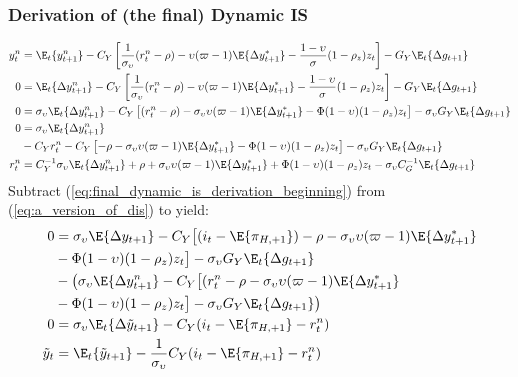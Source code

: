 \subsubsection{Derivation of (the final) Dynamic IS}
\begin{align}\label{eq:final_dynamic_is_derivation_beginning}
    y^n_t  &= \E_t \{y^n_{t+1}\} - C_Y\left[\frac{1}{\sigma_\upsilon}(r^n_t - \rho) - \upsilon (\varpi - 1)\E \{\Delta y_{t+1}^* \}  - \frac{1-\upsilon}{\sigma} (1-\rho_z)z_t\right] - G_Y \E_t \{ \Delta g_{t+1} \}\\
    0  &= \E_t \{\Delta y^n_{t+1}\} - C_Y\left[\frac{1}{\sigma_\upsilon}(r^n_t - \rho) - \upsilon (\varpi - 1)\E \{\Delta y_{t+1}^* \}  - \frac{1-\upsilon}{\sigma} (1-\rho_z)z_t\right] - G_Y \E_t \{ \Delta g_{t+1} \}\\
    0  &= \sigma_\upsilon \E_t \{\Delta y^n_{t+1}\} - C_Y\left[(r^n_t - \rho) - \sigma_\upsilon \upsilon (\varpi - 1)\E \{\Delta y_{t+1}^* \}  - \Phi (1-\upsilon)(1-\rho_z)z_t\right] - \sigma_\upsilon G_Y \E_t \{ \Delta g_{t+1} \}\\
    0  &= \sigma_\upsilon \E_t \{\Delta y^n_{t+1}\} \nonumber \\ 
        &- C_Y r^n_t - C_Y\left[-\rho - \sigma_\upsilon \upsilon (\varpi - 1)\E \{\Delta y_{t+1}^* \}  - \Phi (1-\upsilon)(1-\rho_z)z_t\right] - \sigma_\upsilon G_Y \E_t \{ \Delta g_{t+1} \}\\
    r^n_t  &= C_Y^{-1}\sigma_\upsilon \E_t \{\Delta y^n_{t+1}\} + \rho + \sigma_\upsilon \upsilon (\varpi - 1)\E \{\Delta y_{t+1}^* \}  + \Phi (1-\upsilon)(1-\rho_z)z_t - \sigma_\upsilon C_G^{-1}\E_t \{ \Delta g_{t+1} \} \label{eq:appendix_natural_rate_of_interest_dynamic_is}
\end{align}
Subtract (\ref{eq:final_dynamic_is_derivation_beginning}) from (\ref{eq:a_version_of_dis}) to yield:
\begin{align}
    0 &= \sigma_\upsilon \E \{\Delta y_{t+1} \} - C_Y\big[(i_t - \E \{ \pi_{H,+1}\}) - \rho - \sigma_\upsilon \upsilon (\varpi - 1)\E \{\Delta y_{t+1}^* \} \nonumber \\ 
    &- \Phi(1-\upsilon) (1-\rho_z)z_t \big] - \sigma_\upsilon G_Y \E_t \{ \Delta g_{t+1} \} \nonumber \\
    &- \big(\sigma_\upsilon \E \{\Delta y_{t+1}^n \} - C_Y\big[(r^n_t - \rho - \sigma_\upsilon \upsilon (\varpi - 1)\E \{\Delta y_{t+1}^* \} \nonumber \\ 
    &- \Phi(1-\upsilon) (1-\rho_z)z_t \big] - \sigma_\upsilon G_Y \E_t \{ \Delta g_{t+1} \} \big) \\
    0 &= \sigma_\upsilon \E_t \{\Delta \tilde{y}_{t+1} \} - C_Y(i_t - \E \{ \pi_{H,+1}\} - r^n_t)\\
    \tilde{y}_t &= \E_t\{\tilde{y}_{t+1}\} - \frac{1}{\sigma_\upsilon}C_Y(i_t - \E \{ \pi_{H,+1}\} - r^n_t) \label{eq:final_dynamic_is_derivation_end}
\end{align}